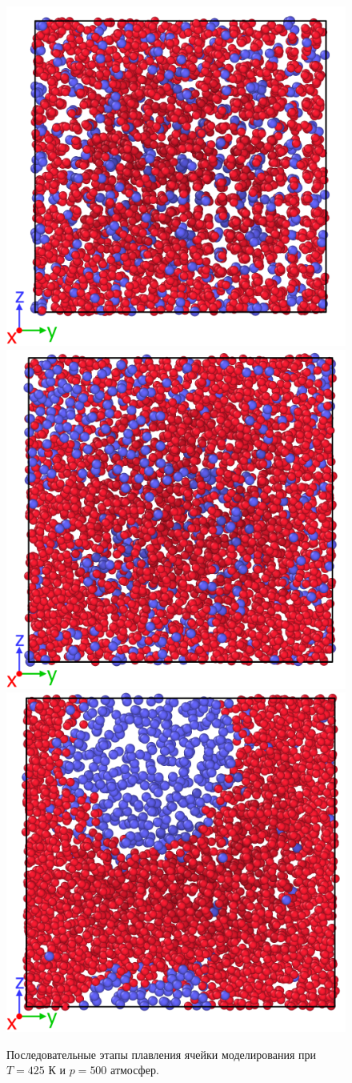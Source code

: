 \begin{figure}[H]
    \centering
    \begin{minipage}{\linewidth}
    \includegraphics[width=.325\linewidth]{figures/press1.png}
    \includegraphics[width=.325\linewidth]{figures/press2.png}
    \includegraphics[width=.325\linewidth]{figures/press3.png}
    \end{minipage}
    \caption{Последовательные этапы плавления ячейки моделирования при $T=425$ К и $p=500$ атмосфер.}
    \label{fig3.3}
\end{figure}

